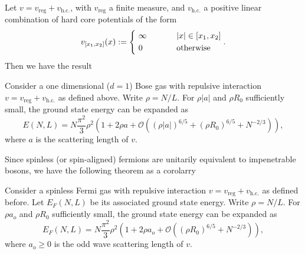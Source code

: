 \documentclass[final]{beamer}
\newlength{\colwidth}
\begin{document}
\begin{frame}[t]
\begin{columns}[t]
\begin{column}{\colwidth}
		\begin{tcolorbox}[colframe=qmathblue,colback=qmathbluelyslyslys,title=Main result]
			Let $ v=v_{\text{reg}}+v_{\text{h.c.}} $, with $ v_{\text{reg}} $ a finite measure, and $ v_{\text{h.c.}} $ a positive linear combination of hard core potentials of the form 
			\begin{equation*}
			v_{[x_1,x_2]}(x):=\begin{cases*}
			\ \infty& \phantom{when} $|x|\in [x_1,x_2]$\\
			\ 0 & \phantom{when} \text{otherwise}
			\end{cases*}.
			\end{equation*}
			Then we have the result
			\begin{theorem}
				\label{TheoremMain}
				Consider a one dimensional ($ d=1 $) Bose gas with repulsive interaction  $v=v_{\text{reg}}+v_{\text{h.c.}}$ as defined above. Write $\rho=N/L$. For $\rho|a|$ and $\rho R_0$ sufficiently small, the ground state energy can be expanded as 
				\begin{equation}
				\label{result}
				E(N,L)=N\frac{\pi^2}{3}\rho^2\left(1+2\rho a+
				\mathcal{O}
				\left((\rho|a|)^{6/5}+(\rho R_0)^{6/5}+N^{-2/3}\right)\right),
				\end{equation}
				where $a$ is the scattering length of $v$.
			\end{theorem}
			Since spinless (or spin-aligned) fermions are unitarily equivalent to impenetrable bosons, we have the following theorem as a corolarry 
			\begin{theorem}\label{TheoremFermion}
				Consider a spinless Fermi gas with repulsive interaction  $v=v_{\text{reg}}+v_{\text{h.c.}}$ as defined before. Let $ E_F(N,L)$ be its associated ground state energy. Write $\rho=N/L$. For $\rho a_o$ and $\rho R_0$ sufficiently small, the ground state energy can be expanded as 
				\begin{equation}
				E_F(N,L)=N\frac{\pi^2}{3}\rho^2\left(1+2\rho a_o+\mathcal{O}\left(\left(\rho R_0\right)^{6/5}+N^{-2/3}\right)\right),
				\end{equation}
				where $ a_o\geq0 $ is the odd wave scattering length of $v$. 
			\end{theorem} 
		\end{tcolorbox}	
		

\end{column}
\end{columns}
\end{frame}
\end{document}
